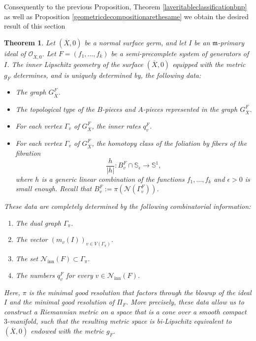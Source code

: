 \documentclass[reqno,dvipsnames,12pt]{amsart}
\newtheorem{thm}{Theorem}[section]
\begin{document}
Consequently to the previous Proposition, Theorem \ref{laveritableclassificationbnp} as well as Proposition \ref{geometricdecompositionarethesame} we obtain the desired result of this section 
\begin{thm}\label{laveritableclassificationideal}
Let $(\overline{X},0)$ be a normal surface germ, and let $I$ be an $\mathfrak{m}$-primary ideal of $\mathcal{O}_{\overline{X},0}$. Let $F=(f_1,\dots,f_k)$ be a semi-precomplete system of generators of $I$. The inner Lipschitz geometry of the surface $(\overline{X},0)$ equipped with the metric $g_F$ determines, and is uniquely determined by, the following data:
\begin{itemize}
    \item The graph $G_{\overline{X}}^{F}$.
    \item The topological type of the $B$-pieces and $A$-pieces represented in the graph $G_{\overline{X}}^{F}$.
    \item For each vertex $\Gamma_v$ of $G_{\overline{X}}^{F}$, the inner rates $q_v^{F}$.
    \item For each vertex $\Gamma_v$ of $G_{\overline{X}}^{F}$, the homotopy class of the foliation by fibers of the fibration
    \[
    \frac{h}{|h|}: B_v^{F} \cap \mathbb{S}_{\epsilon}\longrightarrow \mathbb{S}^1,
    \]
    where $h$ is a generic linear combination of the functions $f_1, \dots, f_k$ and $\epsilon>0$ is small enough. Recall that $B_v^{F} := \pi(\mathcal{N}(\Gamma_v^{F}))$.
\end{itemize}

These data are completely determined by the following combinatorial information:
\begin{enumerate}
    \item The dual graph $\Gamma_{\pi}$.
    \item The vector $(m_v(I))_{v \in V(\Gamma_{\pi})}$.
    \item The set $\mathcal{N}_{\mathrm{inn}}(F) \subset \Gamma_{\pi}$.
    \item The numbers $q_v^{F}$ for every $v \in \mathcal{N}_{\mathrm{inn}}(F)$.
\end{enumerate}

Here, $\pi$ is the minimal good resolution that factors through the blowup of the ideal $I$ and the minimal good resolution of $\Pi_{F}$.   More precisely, these data allow us to construct a Riemannian metric on a space that is a cone over a smooth compact \(3\)-manifold, such that the resulting metric space is bi-Lipschitz equivalent to \((\overline{X},0)\) endowed with the metric $g_F$.
\end{thm}
\end{document}
